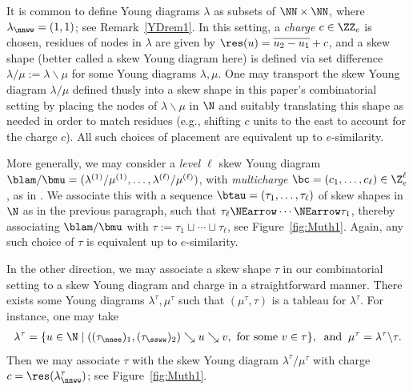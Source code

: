 It is common to define Young diagrams \( \lambda\) as subsets of \( \NN \times \NN\), where \(\lambda_{\nnww} = (1,1)\); see Remark~\ref{YDrem1}. In this setting, a {\em charge} \(c \in \ZZ_e\) is chosen, residues of nodes in \(\lambda\) are given by \(\res(u) = \overline{u_2 - u_1} + c\), and a skew shape (better called a skew Young diagram here) is defined via set difference \(\lambda / \mu := \lambda \backslash \mu\) for some Young diagrams \(\lambda, \mu\). One may transport the skew Young diagram \(\lambda/\mu\) defined thusly into a skew shape in this paper's combinatorial setting by placing the nodes of \(\lambda\backslash\mu\) in \(\N\) and suitably translating this shape as needed in order to match residues (e.g., shifting \(c\) units to the east to account for the charge \(c\)). All such choices of placement are equivalent up to \(e\)-similarity.


More generally, we may consider a {\em level \(\ell\)} skew Young diagram \(\blam/\bmu = (\lambda^{(1)}/\mu^{(1)}, \ldots, \lambda^{(\ell)}/\mu^{(\ell)})\), with {\em multicharge} \(\bc = (c_1, \ldots, c_\ell) \in \Z_e^\ell\), as in \cite{KMRUnivSpecht, HuMaCell, MuSkew}. We associate this with a sequence \(\btau = (\tau_1, \ldots, \tau_\ell)\) of skew shapes in \(\N\) as in the previous paragraph, such that \(\tau_\ell \NEarrow \cdots \NEarrow \tau_1\), thereby associating \(\blam/\bmu\) with \(\tau:= \tau_1 \sqcup \cdots \sqcup \tau_\ell\), see Figure~\ref{fig:Muth1}. Again, any such choice of \(\tau\) is equivalent up to \(e\)-similarity.

In the other direction, we may associate a skew shape \(\tau\) in our combinatorial setting to a skew Young diagram and charge in a straightforward manner. There exists some Young diagrams \(\lambda^\tau, \mu^\tau\) such that \((\mu^\tau, \tau)\) is a tableau for \(\lambda^\tau\). For instance, one may take
\begin{align*}
\lambda^\tau = \{ u \in \N \mid ((\tau_{\nnee})_1, (\tau_{\ssww})_2) \searrow u \searrow v, \textup{ for some }v \in \tau\},
\;\;
\textup{and}
\;\;
\mu^\tau = \lambda^\tau \backslash \tau.
\end{align*}
Then we may associate \(\tau\) with the skew Young diagram \(\lambda^\tau / \mu^\tau\) with charge \(c = \res(\lambda^\tau_{\nnww})\); see Figure~\ref{fig:Muth1}.

